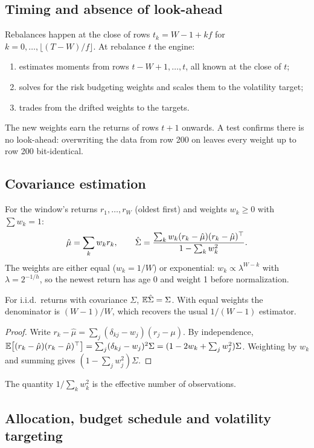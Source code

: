 \documentclass[11pt,a4paper]{article}
\makeatletter
\newcommand{\snippetsource}[1]{\csname snippet@#1\endcsname}
\newcommand{\snippet}[3]{%
  }
\makeatother
\begin{document}
\subsection{Timing and absence of look-ahead}
Rebalances happen at the close of rows $t_k=W-1+kf$ for $k=0,\dots,\lfloor(T-W)/f\rfloor$.
At rebalance $t$ the engine:
\begin{enumerate}
  \item estimates moments from rows $t-W+1,\dots,t$, all known at the close of $t$;
  \item solves for the risk budgeting weights and scales them to the volatility target;
  \item trades from the drifted weights to the targets.
\end{enumerate}
The new weights earn the returns of rows $t+1$ onwards. A test confirms there is no
look-ahead: overwriting the data from row 200 on leaves every weight up to row 200
bit-identical.

\subsection{Covariance estimation}
For the window's returns $r_1,\dots,r_W$ (oldest first) and weights $w_k\ge0$ with
$\sum w_k=1$:
\[
  \hat\mu=\sum_kw_kr_k,\qquad
  \hat\Sigma=\frac{\sum_kw_k(r_k-\hat\mu)(r_k-\hat\mu)^\top}{1-\sum_kw_k^2}.
\]
The weights are either equal ($w_k=1/W$) or exponential: $w_k\propto\lambda^{W-k}$ with
$\lambda=2^{-1/h}$, so the newest return has age 0 and weight 1 before normalization.

\begin{proposition}
For i.i.d.\ returns with covariance $\Sigma$, $\mathbb{E}\hat\Sigma=\Sigma$. With equal weights the
denominator is $(W-1)/W$, which recovers the usual $1/(W-1)$ estimator.
\end{proposition}
\begin{proof}
Write $r_k-\hat\mu=\sum_j(\delta_{kj}-w_j)(r_j-\mu)$. By independence,
$\mathbb{E}\big[(r_k-\hat\mu)(r_k-\hat\mu)^\top\big]=\sum_j(\delta_{kj}-w_j)^2\Sigma=(1-2w_k+\sum_jw_j^2)\Sigma$.
Weighting by $w_k$ and summing gives $(1-\sum_jw_j^2)\Sigma$.
\end{proof}
The quantity $1/\sum_kw_k^2$ is the effective number of observations.
\snippet{cov_estimate}{C++}{Window moments}

\subsection{Allocation, budget schedule and volatility targeting}
\end{document}
